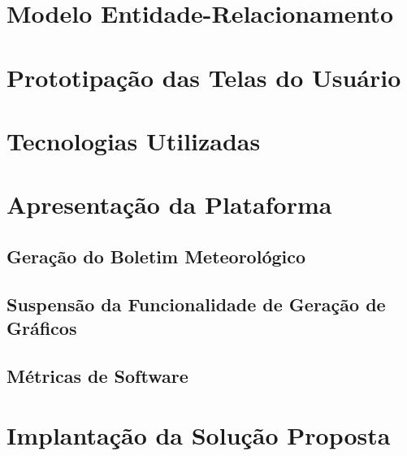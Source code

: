 \section{Modelo Entidade-Relacionamento}


\section{Prototipação das Telas do Usuário} \label{sec:prototipo}


\section{Tecnologias Utilizadas} \label{sec:tecnologias}


\section{Apresentação da Plataforma} \label{sec:apresenta}


\subsection{Geração do Boletim Meteorológico}


\subsection{Suspensão da Funcionalidade de Geração de Gráficos}


\subsection{Métricas de Software} \label{sec:metricas}


\section{Implantação da Solução Proposta} \label{sec:implantancao}

